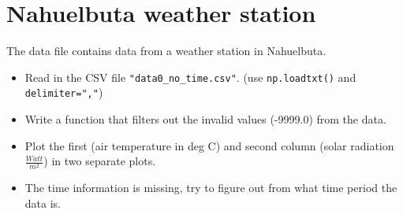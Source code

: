
\section{Nahuelbuta weather station}

The data file contains data from a weather station in Nahuelbuta.

\begin{itemize}
    \item Read in the CSV file \verb|"data0_no_time.csv"|. (use \verb|np.loadtxt()| and \verb|delimiter=","|)
    \item Write a function that filters out the invalid values (-9999.0) from the data.
    \item Plot the first (air temperature in deg C) and second column (solar radiation $\frac{Watt}{m^2}$) in two separate plots.
    \item The time information is missing, try to figure out from what time period the data is.
\end{itemize}

